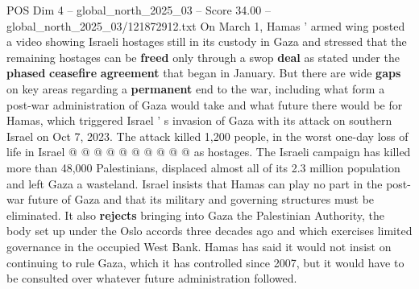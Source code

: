 \begin{textsample}{POS Dim 4 – global\_north\_2025\_03 – Score 34.00 – global\_north\_2025\_03/121872912.txt}
On March 1, Hamas ' armed wing posted a video showing Israeli hostages still in its custody in Gaza and stressed that the remaining hostages can be \textbf{freed} only through a swop \textbf{deal} as stated under the \textbf{phased} \textbf{ceasefire} \textbf{agreement} that began in January.
But there are wide \textbf{gaps} on key areas regarding a \textbf{permanent} end to the war, including what form a post-war administration of Gaza would take and what future there would be for Hamas, which triggered Israel ' s invasion of Gaza with its attack on southern Israel on Oct 7, 2023.
The attack killed 1,200 people, in the worst one-day loss of life in Israel @ @ @ @ @ @ @ @ @ @ as hostages.
The Israeli campaign has killed more than 48,000 Palestinians, displaced almost all of its 2.3 million population and left Gaza a wasteland.
Israel insists that Hamas can play no part in the post-war future of Gaza and that its military and governing structures must be eliminated.
It also \textbf{rejects} bringing into Gaza the Palestinian Authority, the body set up under the Oslo accords three decades ago and which exercises limited governance in the occupied West Bank.
Hamas has said it would not insist on continuing to rule Gaza, which it has controlled since 2007, but it would have to be consulted over whatever future administration followed.

\end{textsample}
